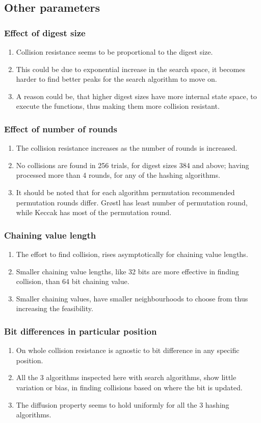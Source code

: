 \documentclass{beamer}
\begin{document}
\subsection{Other parameters}

\begin{frame}
\frametitle{Effect of digest size}
\begin{enumerate}
\item Collision resistance seems to be proportional to the digest size.
\item This could be due to exponential increase in the search space, it becomes harder to find better peaks
for the search algorithm to move on.
\item A reason could be, that higher digest sizes have more internal state space, to execute the functions,
thus making them more collision resistant.
\end{enumerate}
\end{frame}

\begin{frame}
\frametitle{Effect of number of rounds}
\begin{enumerate}
\item The collision resistance increases as the number of rounds is increased.
\item No collisions are found in 256 trials, for digest sizes 384 and above; having processed more than 4
rounds, for any of the hashing algorithms.
\item It should be noted that for each algorithm permutation recommended permutation rounds differ. Gr{\o}stl
has least number of permutation round, while Keccak has most of the permutation round.
\end{enumerate}
\end{frame}

\begin{frame}
\frametitle{Chaining value length}
\begin{enumerate}
\item The effort to find collision, rises asymptotically for chaining value lengths.
\item Smaller chaining value lengths, like 32 bits are more effective in finding collision, than 64 bit
chaining value.
\item Smaller chaining values, have smaller neighbourhoods to choose from thus increasing the feasibility.
\end{enumerate}
\end{frame}

\begin{frame}
\frametitle{Bit differences in particular position}
\begin{enumerate}
\item On whole collision resistance is agnostic to bit difference in any specific position.
\item All the 3 algorithms inspected here with search algorithms, show little variation or bias, in finding
collisions based on where the bit is updated.
\item The diffusion property seems to hold uniformly for all the 3 hashing algorithms.
\end{enumerate}
\end{frame}
\end{document}
